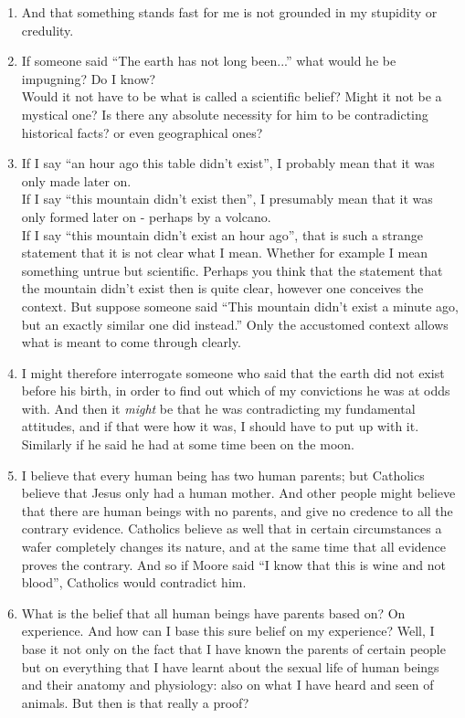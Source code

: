 \documentclass{book}
\begin{document}
\begin{enumerate}
\item
And that something stands fast for me is not grounded in my stupidity or
credulity.

\item
If someone said ``The earth has not long been...'' what would he be impugning?
Do I know? \\
Would it not have to be what is called a scientific belief? Might it not be a
mystical one? Is there any absolute necessity for him to be contradicting
historical facts? or even geographical ones?

\item
If I say ``an hour ago this table didn't exist'', I probably mean that it was
only made later on. \\
If I say ``this mountain didn't exist then'', I presumably mean that it was
only formed later on - perhaps by a volcano. \\
If I say ``this mountain didn't exist an hour ago'', that is such a strange
statement that it is not clear what I mean. Whether for example I mean
something untrue but scientific. Perhaps you think that the statement that the
mountain didn't exist then is quite clear, however one conceives the context.
But suppose someone said ``This mountain didn't exist a minute ago, but an
exactly similar one did instead.'' Only the accustomed context allows what is
meant to come through clearly.

\item
I might therefore interrogate someone who said that the earth did not exist
before his birth, in order to find out which of my convictions he was at odds
with. And then it \emph{might} be that he was contradicting my fundamental
attitudes, and if that were how it was, I should have to put up with it. \\
Similarly if he said he had at some time been on the moon.

\item
I believe that every human being has two human parents; but Catholics believe
that Jesus only had a human mother. And other people might believe that there
are human beings with no parents, and give no credence to all the contrary
evidence. Catholics believe as well that in certain circumstances a wafer
completely changes its nature, and at the same time that all evidence proves
the contrary. And so if Moore said ``I know that this is wine and not blood'',
Catholics would contradict him.

\item
What is the belief that all human beings have parents based on? On experience.
And how can I base this sure belief on my experience? Well, I base it not only
on the fact that I have known the parents of certain people but on everything
that I have learnt about the sexual life of human beings and their anatomy and
physiology: also on what I have heard and seen of animals. But then is that
really a proof?


\end{enumerate}
\end{document}
